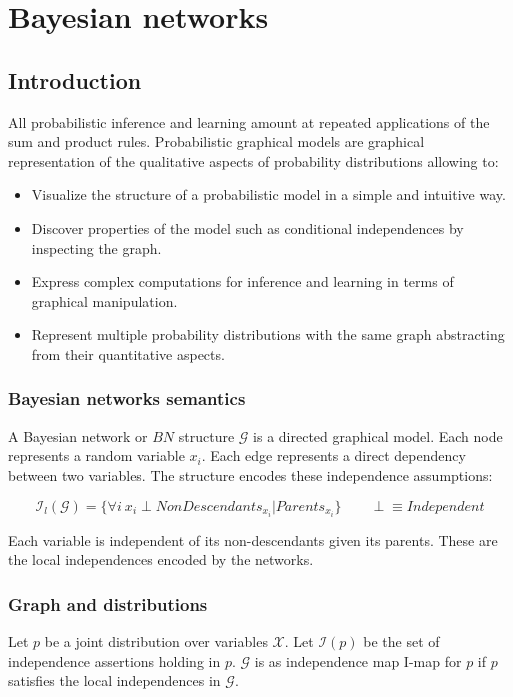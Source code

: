 \chapter{Bayesian networks}

\section{Introduction}
All probabilistic inference and learning amount at repeated applications of the sum and product rules.
Probabilistic graphical models are graphical representation of the qualitative aspects of probability distributions allowing to:

\begin{multicols}{2}
	\begin{itemize}
		\item Visualize the structure of a probabilistic model in a simple and intuitive way.
		\item Discover properties of the model such as conditional independences by inspecting the graph.
		\item Express complex computations for inference and learning in terms of graphical manipulation.
		\item Represent multiple probability distributions with the same graph abstracting from their quantitative aspects.
	\end{itemize}
\end{multicols}

	\subsection{Bayesian networks semantics}
	A Bayesian network or $BN$ structure $\mathcal{G}$ is a directed graphical model.
	Each node represents a random variable $x_i$.
	Each edge represents a direct dependency between two variables.
	The structure encodes these independence assumptions:

	$$\mathcal{I}_l(\mathcal{G}) = \{\forall i\ x_i \perp NonDescendants_{x_i}|Parents_{x_i}\} \qquad\perp \equiv Independent$$

	Each variable is independent of its non-descendants given its parents.
	These are the local independences encoded by the networks.

	\subsection{Graph and distributions}
	Let $p$ be a joint distribution over variables $\mathcal{X}$.
	Let $\mathcal{I}(p)$ be the set of independence assertions holding in $p$.
	$\mathcal{G}$ is as independence map I-map for $p$ if $p$ satisfies the local independences in $\mathcal{G}$.

